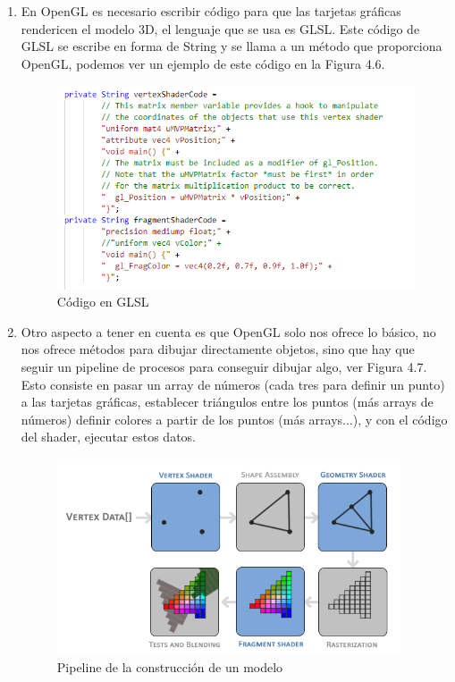 \begin{enumerate}
    
    \item En OpenGL es necesario escribir código para que las tarjetas gráficas rendericen el modelo 3D,
    el lenguaje que se usa es GLSL. Este código de GLSL se escribe en forma de String y se llama a un método 
    que proporciona OpenGL, podemos ver un ejemplo de este código en la Figura 4.6.
    \begin{figure}[H]
        \centering
        \includegraphics[width=5in]{figures/GLSL.png}
        \caption{Código en GLSL}
    \end{figure}
    \newpage    
    \item Otro aspecto a tener en cuenta es que OpenGL solo nos ofrece lo básico, no nos ofrece métodos para dibujar 
    directamente objetos, sino que hay que seguir un pipeline de procesos para conseguir dibujar algo, ver Figura 4.7.
    Esto consiste en pasar un array de números (cada tres para definir un punto) 
    a las tarjetas gráficas, establecer triángulos entre los puntos (más arrays de números) 
    definir colores a partir de los puntos (más arrays...), y con el código del shader, ejecutar 
    estos datos.
    \begin{figure}
        \centering
        \includegraphics[width=4in]{figures/pipeline.png}
        \caption{Pipeline de la construcción de un modelo\cite{pipelineopengl}}

\end{figure}
\end{enumerate}

